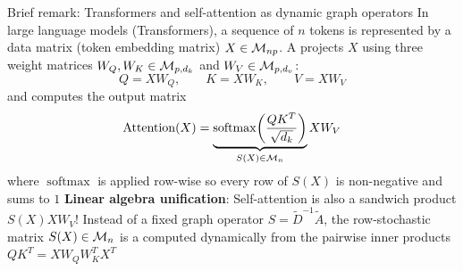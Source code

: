\documentclass[aspectratio=169]{beamer}\usepackage[]{graphicx}\usepackage[]{xcolor}
\begin{document}
\begin{frame}{Brief remark: Transformers and self-attention as dynamic graph operators}
In large language models (Transformers), a sequence of $n$ tokens is represented by a data matrix (token embedding matrix) $X \in \mathcal{M}_{np}$. A  projects $X$ using three weight matrices $W_Q, W_K \in \mathcal{M}_{p, d_k}$ and $W_V \in \mathcal{M}_{p, d_v}$:
\[
Q = X W_Q, \qquad K = X W_K, \qquad V = X W_V
\]
and computes the output matrix
\[
\operatorname{Attention}(X) = \underbrace{\operatorname{softmax}\!\left(\frac{Q K^T}{\sqrt{d_k}}\right)}_{S(X) \in \mathcal{M}_n} X W_V
\]
where $\operatorname{softmax}$ is applied row-wise so every row of $S(X)$ is non-negative and sums to $1$
\vfill
\textbf{Linear algebra unification}: Self-attention is also a sandwich product $S(X) X W_V$! Instead of a fixed graph operator $S = \tilde{D}^{-1}\tilde{A}$, the row-stochastic matrix $S(X) \in \mathcal{M}_n$ is a  computed dynamically from the pairwise inner products $Q K^T = X W_Q W_K^T X^T$
\end{frame}
\end{document}
